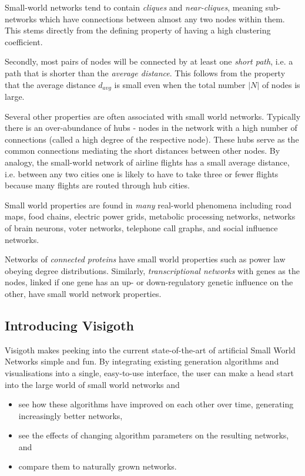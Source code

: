 \documentclass[a4paper,11pt,titlepage]{article}
\begin{document}
Small-world networks tend to contain \emph{cliques} and
\emph{near-cliques}, meaning sub-networks which have connections
between almost any two nodes within them. This stems directly from
the defining property of having a high clustering coefficient.

Secondly, most pairs of nodes will be connected by at least one
\emph{short path}, i.e. a path that is shorter than the
\emph{average distance}.
This follows from the property that the average distance $d_{avg}$
is small even when the total number $|N|$ of nodes is large.

Several other properties are often associated with small world
networks. Typically there is an over-abundance of hubs - nodes
in the network with a high number of connections (called a high
degree of the respective node). These hubs serve as the common
connections mediating the short distances between other
nodes. By analogy, the small-world network of airline flights
has a small average distance, i.e. between any two cities one
is likely to have to take three or fewer flights because many
flights are routed through hub cities. \cite{smnet}

Small world properties are found in \emph{many} real-world
phenomena including road maps, food chains, electric power
grids, metabolic processing networks, networks of brain
neurons, voter networks, telephone call graphs, and social
influence networks.

Networks of \emph{connected proteins} have small world properties
such as power law obeying degree distributions. Similarly,
\emph{transcriptional networks} with genes as the nodes,
linked if one gene has an up- or down-regulatory genetic
influence on the other, have small world network properties.



\subsection{Introducing Visigoth}

Visigoth makes peeking into the current state-of-the-art of artificial Small
World Networks simple and fun. By integrating existing generation algorithms and
visualisations into a single, easy-to-use interface, the user can make a head
start into the large world of small world networks and

\begin{itemize}
  \item see how these algorithms have improved on each other over time,
    generating increasingly better networks,
  \item see the effects of changing algorithm parameters on the
    resulting networks, and
  \item compare them to naturally grown networks.
\end{itemize}
\end{document}
